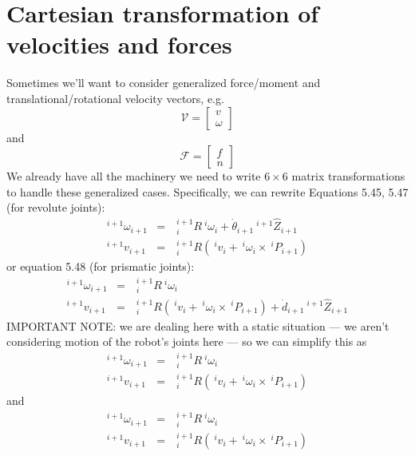 \documentclass[]{article}
\begin{document}
\section{Cartesian transformation of velocities and forces}
Sometimes we'll want to consider generalized force/moment and translational/rotational velocity vectors, e.g.
\begin{displaymath}
\mathcal{V} = \left[\begin{array}{c}v \\ \omega \end{array}\right]
\end{displaymath}
and
\begin{displaymath}
\mathcal{F} = \left[\begin{array}{c}f \\ n \end{array}\right]
\end{displaymath}
We already have all the machinery we need to write $6 \times 6$ matrix transformations to handle these generalized cases. Specifically, we can rewrite Equations 5.45, 5.47 (for revolute joints):
\begin{eqnarray}
^{i+1}\omega_{i+1} & = & \ \!^{i+1}_{i}R\ \!^{i}\omega_{i} + \dot{\theta}_{i+1}\ \!^{i+1}\hat{Z}_{i+1} \nonumber \\
^{i+1}v_{i+1} & = & \ \!^{i+1}_{i}R\left(\ \!^{i}v_{i} + \ \!^{i}\omega_{i} \times \ \!^{i}P_{i+1}\right) \nonumber
\end{eqnarray}
or equation 5.48 (for prismatic joints):
\begin{eqnarray}
^{i+1}\omega_{i+1} & = & \ \!^{i+1}_{i}R\ \!^{i}\omega_{i} \nonumber \\
^{i+1}v_{i+1} & = & \ \!^{i+1}_{i}R\left(\ \!^{i}v_{i} + \ \!^{i}\omega_{i} \times \ \!^{i}P_{i+1}\right) + \dot{d}_{i+1}\ \!^{i+1}\hat{Z}_{i+1} \nonumber
\end{eqnarray}
IMPORTANT NOTE: we are dealing here with a static situation --- we aren't considering motion of the robot's joints here --- so we can simplify this as
\begin{eqnarray}
^{i+1}\omega_{i+1} & = & \ \!^{i+1}_{i}R\ \!^{i}\omega_{i}  \nonumber \\
^{i+1}v_{i+1} & = & \ \!^{i+1}_{i}R\left(\ \!^{i}v_{i} + \ \!^{i}\omega_{i} \times \ \!^{i}P_{i+1}\right) \nonumber
\end{eqnarray}
and
\begin{eqnarray}
^{i+1}\omega_{i+1} & = & \ \!^{i+1}_{i}R\ \!^{i}\omega_{i} \nonumber \\
^{i+1}v_{i+1} & = & \ \!^{i+1}_{i}R\left(\ \!^{i}v_{i} + \ \!^{i}\omega_{i} \times \ \!^{i}P_{i+1}\right) \nonumber
\end{eqnarray}
\end{document}
